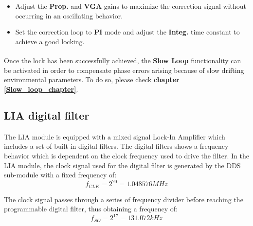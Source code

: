 \begin{itemize}
    \item Adjust the \textbf{Prop.} and \textbf{VGA} gains to maximize the correction signal without occurring in an oscillating behavior.
    
    \item Set the correction loop to \textbf{PI} mode and adjust the \textbf{Integ.} time constant to achieve a good locking.
    
\end{itemize}


\paragraph{} Once the lock has been successfully achieved, the \textbf{Slow Loop} functionality can be activated in order to compensate phase errors arising because of slow drifting environmental parameters. To do so, please check \textbf{chapter \ref{Slow_loop_chapter}}.





\subsection{LIA digital filter}
\paragraph{}The LIA module is equipped with a mixed signal Lock-In Amplifier which includes a set of built-in digital filters. The digital filters shows a frequency behavior which is dependent on the clock frequency used to drive the filter. In the LIA module, the clock signal used for the digital filter is generated by the DDS sub-module with a fixed frequency of:
\[ f_{CLK} = 2^{20} = 1.048576 MHz\]

The clock signal passes through a series of frequency divider before reaching the programmable digital filter, thus obtaining a frequency of:
\[ f_{SO} = 2^{17} = 131.072 kHz\]


